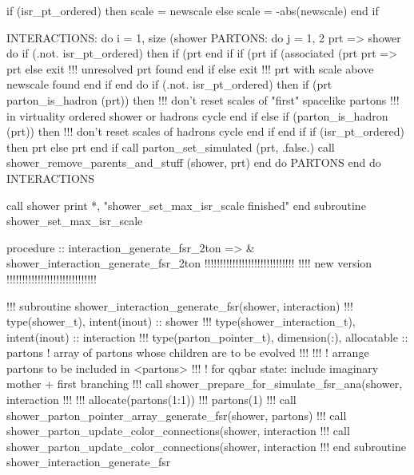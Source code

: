    if (isr_pt_ordered) then
       scale = newscale
    else
       scale = -abs(newscale)
    end if

    INTERACTIONS: do i = 1, size (shower%
       PARTONS: do j = 1, 2
          prt => shower%
          do
             if (.not. isr_pt_ordered) then
                if (prt%
             end if
               if (prt%
                  if (associated (prt%
                     prt => prt%
                  else
                     exit   !!! unresolved prt found
                  end if
               else
                  exit   !!! prt with scale above newscale found
               end if
            end do
            if (.not. isr_pt_ordered) then
               if (prt%
                    parton_is_hadron (prt)) then
                  !!! don't reset scales of "first" spacelike partons
                  !!!    in virtuality ordered shower or hadrons
                  cycle
               end if
            else
               if (parton_is_hadron (prt)) then
                  !!! don't reset scales of hadrons
                  cycle
               end if
            end if
            if (isr_pt_ordered) then
               prt%
            else
               prt%
            end if
            call parton_set_simulated (prt, .false.)
            call shower_remove_parents_and_stuff (shower, prt)
         end do PARTONS
      end do INTERACTIONS

      call shower%
      print *, "shower_set_max_isr_scale finished"
    end subroutine shower_set_max_isr_scale

\eatline
\nwendcode{}\nwdocspar
\nwenddocs{}\plusendmoddef
  procedure :: interaction_generate_fsr_2ton => &
       shower_interaction_generate_fsr_2ton
\nwendcode{}\nwdocspar
\nwenddocs{}\plusendmoddef
!!!!!!!!!!!!!!!!!!!!!!!!!!!!!
!!!! new version
!!!!!!!!!!!!!!!!!!!!!!!!!!!!!

!!!    subroutine shower_interaction_generate_fsr(shower, interaction)
!!!      type(shower_t), intent(inout) :: shower
!!!      type(shower_interaction_t), intent(inout) :: interaction
!!!      type(parton_pointer_t), dimension(:), allocatable :: partons   ! array of partons whose children are to be evolved
!!!
!!!      ! arrange partons to be included in <partons>
!!!      ! for qqbar state: include imaginary mother + first branching
!!!      call shower_prepare_for_simulate_fsr_ana(shower, interaction%
!!!
!!!      allocate(partons(1:1))
!!!      partons(1)%
!!!      call shower_parton_pointer_array_generate_fsr(shower, partons)
!!!      call shower_parton_update_color_connections(shower, interaction%
!!!      call shower_parton_update_color_connections(shower, interaction%
!!!    end subroutine shower_interaction_generate_fsr


